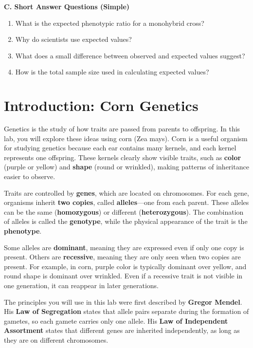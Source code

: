 \documentclass[
  letterpaper,
  DIV=11,
  numbers=noendperiod]{scrreprt}
\begin{document}
\textbf{C. Short Answer Questions (Simple)}

\begin{enumerate}
\def\labelenumi{\arabic{enumi}.}
\item
  What is the expected phenotypic ratio for a monohybrid cross?
\item
  Why do scientists use expected values?
\item
  What does a small difference between observed and expected values
  suggest?
\item
  How is the total sample size used in calculating expected values?
\end{enumerate}

\section{\texorpdfstring{\textbf{Introduction: Corn
Genetics}}{Introduction: Corn Genetics}}\label{introduction-corn-genetics}

Genetics is the study of how traits are passed from parents to
offspring. In this lab, you will explore these ideas using corn (Zea
mays). Corn is a useful organism for studying genetics because each ear
contains many kernels, and each kernel represents one offspring. These
kernels clearly show visible traits, such as \textbf{color} (purple or
yellow) and \textbf{shape} (round or wrinkled), making patterns of
inheritance easier to observe.

Traits are controlled by \textbf{genes}, which are located on
chromosomes. For each gene, organisms inherit \textbf{two copies},
called \textbf{alleles}---one from each parent. These alleles can be the
same (\textbf{homozygous}) or different (\textbf{heterozygous}). The
combination of alleles is called the \textbf{genotype}, while the
physical appearance of the trait is the \textbf{phenotype}.

Some alleles are \textbf{dominant}, meaning they are expressed even if
only one copy is present. Others are \textbf{recessive}, meaning they
are only seen when two copies are present. For example, in corn, purple
color is typically dominant over yellow, and round shape is dominant
over wrinkled. Even if a recessive trait is not visible in one
generation, it can reappear in later generations.

The principles you will use in this lab were first described by
\textbf{Gregor Mendel}. His \textbf{Law of Segregation} states that
allele pairs separate during the formation of gametes, so each gamete
carries only one allele. His \textbf{Law of Independent Assortment}
states that different genes are inherited independently, as long as they
are on different chromosomes.
\end{document}
